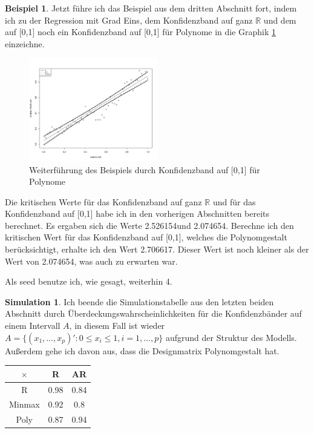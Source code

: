 \documentclass[12pt,a4paper]{article}
\theoremstyle{definition}
\newtheorem{Beispiel}[Definition]{Beispiel}
\theoremstyle{definition}
\theoremstyle{definition}
\newtheorem{Simulation}[Definition]{Simulation}
\newcommand{\cR}{2.526154}
\newcommand{\seedsimulation}{4}
\newcommand{\cA}{2.074654}
\newcommand{\cAP}{2.706617}
\newcommand{\UeberRR}{0.98}
\newcommand{\UeberRMinmax}{0.92}
\newcommand{\UeberRMinmaxPoly}{0.87}
\newcommand{\UeberARR}{0.84}
\newcommand{\UeberARMinmax}{0.8}
\newcommand{\UeberARMinmaxPoly}{0.94}
\begin{document}
\begin{Beispiel}
Jetzt führe ich das Beispiel aus dem dritten Abschnitt fort, indem ich zu der Regression mit Grad Eins, dem Konfidenzband auf ganz $\mathbb{R}$ und dem auf [0,1] noch ein Konfidenzband auf [0,1] für Polynome in die Graphik \ref{KB-poly-BSP} einzeichne.

\begin{figure}[H] 
  \centering
     \includegraphics[width=0.5\textwidth]{Bsp-KB-poly}
  \caption{Weiterführung des Beispiels durch Konfidenzband auf [0,1] für Polynome}
  \label{KB-poly-BSP}
\end{figure}

Die kritischen Werte für das Konfidenzband auf ganz $\mathbb{R}$ und für das Konfidenzband auf [0,1] habe ich in den vorherigen Abschnitten bereits berechnet. Es ergaben sich die Werte \cR und \cA . Berechne ich den kritischen Wert für das Konfidenzband auf [0,1], welches die Polynomgestalt berücksichtigt, erhalte ich den Wert \cAP . Dieser Wert ist noch kleiner als der Wert von \cA , was auch zu erwarten war.

Als seed benutze ich, wie gesagt, weiterhin \seedsimulation .

\end{Beispiel}

\begin{Simulation}
Ich beende die Simulationstabelle aus den letzten beiden Abschnitt durch Überdeckungswahrscheinlichkeiten für die Konfidenzbänder auf einem Intervall $A$, in diesem Fall ist wieder $A = \{ (x_1, \ldots, x_p)' : 0 \leq x_i \leq 1, i=1, \ldots, p \}$ aufgrund der Struktur des Modells. Außerdem gehe ich davon aus, dass die Designmatrix Polynomgestalt hat.

\begin{center}
\begin{tabular}{|c|c|c|}
\hline 
$\times$ & R & AR \\ 
\hline 
R		& \UeberRR			& \UeberARR \\ 
\hline 
Minmax	& \UeberRMinmax	 	& \UeberARMinmax \\ 
\hline 
Poly 	& \UeberRMinmaxPoly & \UeberARMinmaxPoly \\ 
\hline 
\end{tabular} 
\end{center}

\end{Simulation}
\end{document}
